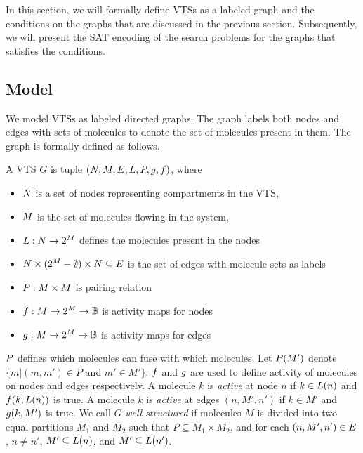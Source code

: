 In this section, we will formally define VTSs as a labeled graph
and the conditions on the graphs that are discussed in the previous
section.
%
Subsequently, we will present the SAT encoding of the search problems
for the graphs that satisfies the conditions.

\subsection{Model}

We model VTSs as labeled directed graphs.
The graph labels both nodes and edges with sets of molecules to denote
the set of molecules present in them.
The graph is formally defined as follows.

\begin{df}
  A VTS $G$ is tuple $(N,M,E,L,P,g,f)$, where
  \begin{itemize}
  \item $N$ is a set of nodes representing compartments in the VTS,
  \item $M$ is the set of molecules flowing in the system, 
  \item $L : N \rightarrow 2^{M}$ defines the molecules present in the nodes  
  \item $ N \times (2^{M}-\emptyset) \times N \subseteq E$ is the
    set of edges with molecule sets as labels
  \item $P : M \times M$ is pairing relation
  \item $f : M \rightarrow 2^{M} \rightarrow \mathbb{B}$ is activity maps for nodes
  \item $g : M \rightarrow 2^{M} \rightarrow \mathbb{B} $ is activity maps for edges
  \end{itemize}
\end{df}
$P$ defines which molecules can fuse with which molecules.
%
Let $P(M')$ denote $\{m|(m,m') \in P \text{ and } m' \in M'\}$.
%
$f$ and $g$ are used to define activity of molecules on
nodes and edges respectively.
%
A molecule $k$ is {\em active} at node $n$ if $k \in L(n)$ and
$f(k,L(n))$ is true.
%
A molecule $k$ is {\em active} at edges $(n,M',n')$ if $k \in M'$ and
$g(k,M')$ is true.
%
We call $G$ {\em well-structured} if molecules $M$ is divided into
two equal partitions $M_1$ and $M_2$ such that $P \subseteq M_1 \times M_2$, and
for each $(n,M',n') \in E$, $n \neq n'$, 
$M' \subseteq L(n)$, and $M' \subseteq L(n')$.
%

